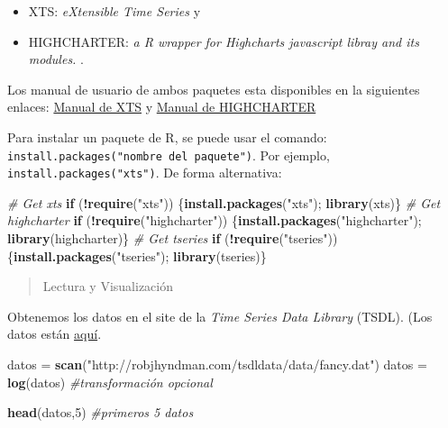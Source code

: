 \documentclass[]{book}
\newenvironment{Shaded}{\begin{snugshade}}{\end{snugshade}}
\newcommand{\CommentTok}[1]{\textcolor[rgb]{0.56,0.35,0.01}{\textit{#1}}}
\newcommand{\ControlFlowTok}[1]{\textcolor[rgb]{0.13,0.29,0.53}{\textbf{#1}}}
\newcommand{\DecValTok}[1]{\textcolor[rgb]{0.00,0.00,0.81}{#1}}
\newcommand{\KeywordTok}[1]{\textcolor[rgb]{0.13,0.29,0.53}{\textbf{#1}}}
\newcommand{\NormalTok}[1]{#1}
\newcommand{\OperatorTok}[1]{\textcolor[rgb]{0.81,0.36,0.00}{\textbf{#1}}}
\newcommand{\StringTok}[1]{\textcolor[rgb]{0.31,0.60,0.02}{#1}}
\providecommand{\tightlist}{%
  \setlength{\itemsep}{0pt}\setlength{\parskip}{0pt}}
\begin{document}
\begin{itemize}
\tightlist
\item
  XTS: \emph{eXtensible Time Series} y
\item
  HIGHCHARTER: \emph{a R wrapper for Highcharts javascript libray and its modules. }.
\end{itemize}

Los manual de usuario de ambos paquetes esta disponibles en la siguientes enlaces: \href{http://cran.r-project.org/web/packages/xts/xts.pdf}{Manual de XTS} y \href{https://cran.r-project.org/web/packages/highcharter/highcharter.pdf}{Manual de HIGHCHARTER}

Para instalar un paquete de R, se puede usar el comando: \texttt{install.packages("nombre\ del\ paquete")}. Por ejemplo, \texttt{install.packages("xts")}. De forma alternativa:

\begin{Shaded}
\begin{Highlighting}[]
\CommentTok{# Get xts}
\ControlFlowTok{if}\NormalTok{ (}\OperatorTok{!}\KeywordTok{require}\NormalTok{(}\StringTok{"xts"}\NormalTok{)) \{}\KeywordTok{install.packages}\NormalTok{(}\StringTok{"xts"}\NormalTok{);    }\KeywordTok{library}\NormalTok{(xts)\}}
\CommentTok{# Get highcharter}
\ControlFlowTok{if}\NormalTok{ (}\OperatorTok{!}\KeywordTok{require}\NormalTok{(}\StringTok{"highcharter"}\NormalTok{)) \{}\KeywordTok{install.packages}\NormalTok{(}\StringTok{"highcharter"}\NormalTok{);    }\KeywordTok{library}\NormalTok{(highcharter)\}}
\CommentTok{# Get tseries}
\ControlFlowTok{if}\NormalTok{ (}\OperatorTok{!}\KeywordTok{require}\NormalTok{(}\StringTok{"tseries"}\NormalTok{)) \{}\KeywordTok{install.packages}\NormalTok{(}\StringTok{"tseries"}\NormalTok{);    }\KeywordTok{library}\NormalTok{(tseries)\}}
\end{Highlighting}
\end{Shaded}

\begin{quote}
Lectura y Visualización
\end{quote}

Obtenemos los datos en el site de la \emph{Time Series Data Library} (TSDL). (Los datos están \href{http://robjhyndman.com/tsdldata/data/fancy.dat}{aquí}.

\begin{Shaded}
\begin{Highlighting}[]
\NormalTok{datos =}\StringTok{ }\KeywordTok{scan}\NormalTok{(}\StringTok{"http://robjhyndman.com/tsdldata/data/fancy.dat"}\NormalTok{)}
\NormalTok{datos =}\StringTok{ }\KeywordTok{log}\NormalTok{(datos) }\CommentTok{#transformación opcional}

\KeywordTok{head}\NormalTok{(datos,}\DecValTok{5}\NormalTok{) }\CommentTok{#primeros 5 datos}
\end{Highlighting}
\end{Shaded}
\end{document}
